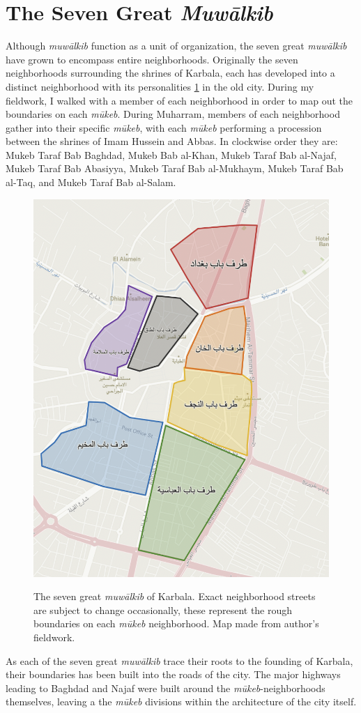 \section{The Seven Great \emph{Muwālkib}} \label{seven-great-mokwebs}
Although \emph{muwālkib} function as a unit of organization, the seven great \emph{muwālkib} have grown to encompass entire neighborhoods. Originally the seven neighborhoods surrounding the shrines of Karbala, each has developed into a distinct neighborhood with its personalities \ref{fig:mowalkib} in the old city. During my fieldwork, I walked with a member of each neighborhood in order to map out the boundaries on each \emph{mūkeb}. During Muharram, members of each neighborhood gather into their specific \emph{mūkeb}, with each \emph{mūkeb} performing a procession between the shrines of Imam Hussein and Abbas. In clockwise order they are:  Mukeb Taraf Bab Baghdad, Mukeb Bab al-Khan, Mukeb Taraf Bab al-Najaf, Mukeb Taraf Bab Abasiyya, Mukeb Taraf Bab al-Mukhaym, Mukeb Taraf Bab al-Taq, and Mukeb Taraf Bab al-Salam.

\begin{figure}[H]
\caption{The seven great \emph{muwālkib} of Karbala. Exact neighborhood streets are subject to change occasionally, these represent the rough boundaries on each \emph{mūkeb} neighborhood. Map made from author's fieldwork.}
\centering
\includegraphics[height=0.75\textwidth]{images/seven-mowkebs.png}
\label{fig:mowalkib}
\end{figure}

As each of the seven great \emph{muwālkib} trace their roots to the founding of Karbala, their boundaries has been built into the roads of the city. The major highways leading to Baghdad and Najaf were built around the \emph{mūkeb}-neighborhoods themselves, leaving a the \emph{mūkeb} divisions within the architecture of the city itself. 

